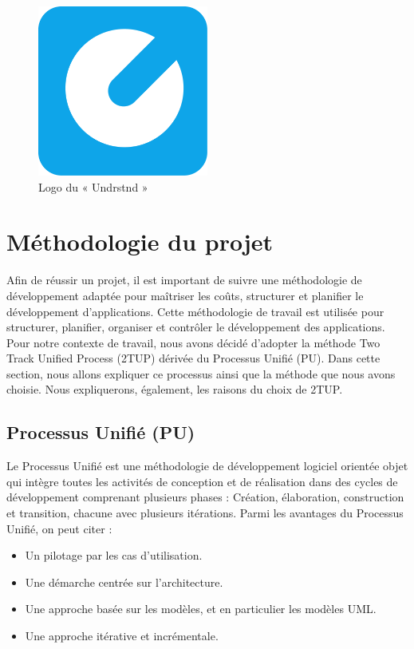 \begin{figure}[ht]
    \centering
    \includegraphics[width=0.5\textwidth]{images/logo.png}
    \caption{Logo du « Undrstnd »}
    \label{fig:undrstnd-logo}    
\end{figure}

\section{Méthodologie du projet}
Afin de réussir un projet, il est important de suivre une méthodologie de développement adaptée pour maîtriser les coûts, structurer et planifier le développement d'applications. Cette méthodologie de travail est utilisée pour structurer, planifier, organiser et contrôler le développement des applications. \\
Pour notre contexte de travail, nous avons décidé  d'adopter la méthode Two Track Unified Process (2TUP) dérivée du Processus Unifié (PU). Dans cette section, nous allons expliquer ce processus ainsi que la méthode que nous avons choisie. Nous expliquerons, également, les raisons du choix de 2TUP.

\subsection{Processus Unifié (PU)}
Le Processus Unifié est une méthodologie de développement logiciel orientée objet qui intègre toutes les activités de conception et de réalisation dans des cycles de développement comprenant plusieurs phases : Création, élaboration, construction et transition, chacune avec plusieurs itérations.
Parmi les avantages du Processus Unifié, on peut citer :
\begin{itemize}[itemsep=2pt, parsep=2pt]
    \item Un pilotage par les cas d’utilisation.
    \item Une démarche centrée sur l’architecture.
    \item Une approche basée sur les modèles, et en particulier les modèles UML.
    \item Une approche itérative et incrémentale.
\end{itemize}

